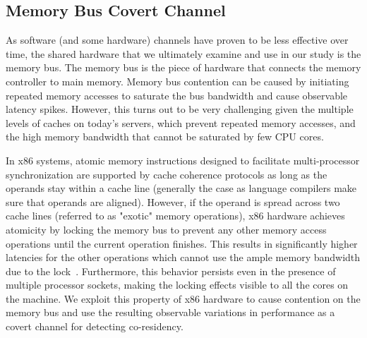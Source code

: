 

\subsection{Memory Bus Covert Channel} 
\label{sec:background:membus} 
As software (and some hardware) channels have proven to be less effective over
time, the shared hardware that we ultimately examine and use in our study is the
memory bus. The memory bus is the piece of hardware that connects the memory
controller to main memory.  Memory bus contention can be caused by initiating
repeated memory accesses to saturate the bus bandwidth and cause observable
latency spikes. However, this turns out to be very challenging given the
multiple levels of caches on today's servers, which prevent repeated memory
accesses, and the high memory bandwidth that cannot be saturated by few CPU
cores. 

In x86 systems, atomic memory instructions designed to facilitate
multi-processor synchronization are supported by cache coherence protocols as
long as the operands stay within a cache line (generally the case as language
compilers make sure that operands are aligned). However, if the operand is
spread across two cache lines (referred to as "exotic" memory operations), x86
hardware achieves atomicity by locking the memory bus to prevent any other
memory access operations until the current operation finishes. This results in
significantly higher latencies for the other operations which cannot use the
ample memory bandwidth due to the lock~\cite{wuusenix2012}. Furthermore, this
behavior persists even in the presence of multiple processor sockets, making the
locking effects visible to all the cores on the machine. We exploit this
property of x86 hardware to cause contention on the memory bus and use the
resulting observable variations in performance as a covert channel for detecting
co-residency. 
